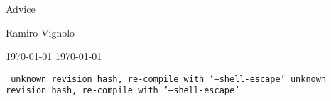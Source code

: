 \documentclass{article}
\begin{document}
\begin{secciondoscol}{Advice}
\end{secciondoscol}



\vspace{\fill}
\hspace{0.6\linewidth}
\begin{minipage}{0.35\linewidth}
 \begin{center}
 Ramiro Vignolo\\
\immediate{}
\immediate{}

\makeatletter
\ifcase\pdf@shellescape
  \today\or
  \or
  \today\fi

\scriptsize{\texttt{
\ifcase\pdf@shellescape
  unknown revision hash, re-compile with '--shell-escape'\or
  \or
  unknown revision hash, re-compile with '--shell-escape'\fi
}}
\makeatother
 
 \end{center}
\end{minipage}
\end{document}
